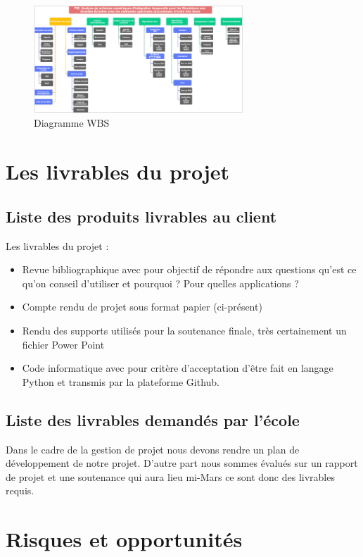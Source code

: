 \documentclass[a4paper,12pt]{report}
\theoremstyle{break}
\begin{document}
  \begin{figure}
     \centering
       \includegraphics[width=0.7\textwidth]{images/WBS.png}
       \caption{Diagramme WBS}
     \label{chaine optim}
  \end{figure}
    
\chapter{Les livrables du projet}
\section{Liste des produits livrables au client}
   Les livrables du projet :
   \begin{itemize}[label=\textbullet]
   	\item Revue bibliographique avec pour objectif de répondre aux questions qu’est ce qu’on conseil d’utiliser et pourquoi ? Pour quelles applications ?
   	\item Compte rendu de projet sous format papier (ci-présent)
   	\item Rendu des supports utilisés pour la soutenance finale, très certainement un fichier Power Point
   	\item  Code informatique avec pour critère d’acceptation d’être fait en langage Python et transmis par la plateforme Github.
    \end{itemize}

\section{Liste des livrables demandés par l’école }

    Dans le cadre de la gestion de projet nous devons rendre un plan de développement de notre projet. D’autre part nous sommes évalués sur un rapport de projet et une soutenance qui aura lieu mi-Mars ce sont donc des livrables requis. 

\chapter{Risques et opportunités}
 
\end{document}

